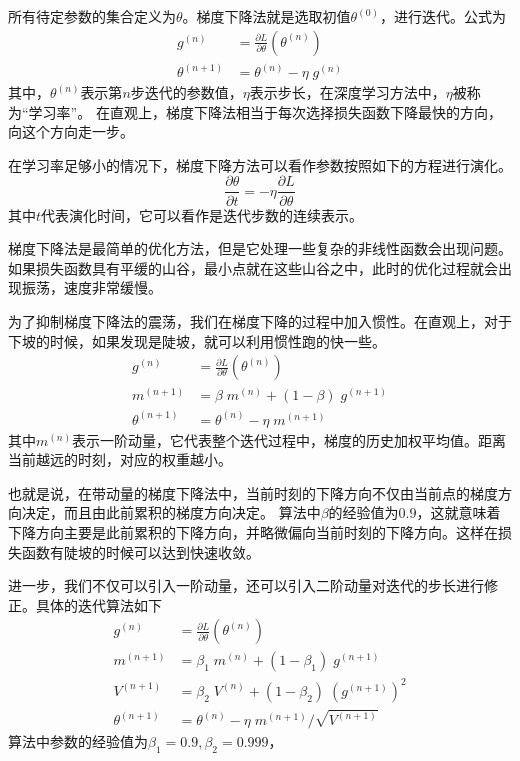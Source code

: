 所有待定参数的集合定义为$\theta$。梯度下降法就是选取初值$\theta^{(0)}$，进行迭代。公式为
\begin{equation}
\begin{split}
g^{(n)} & = \frac{\partial L}{\partial \theta}(\theta^{(n)}) \\
\theta^{(n+1)} & = \theta^{(n)} - \eta \; g^{(n)}
\end{split}
\end{equation}
其中，$\theta^{(n)}$表示第$n$步迭代的参数值，$\eta$表示步长，在深度学习方法中，$\eta$被称为“学习率”。
在直观上，梯度下降法相当于每次选择损失函数下降最快的方向，向这个方向走一步。

在学习率足够小的情况下，梯度下降方法可以看作参数按照如下的方程进行演化。
\begin{equation}
\frac{\partial \theta}{\partial t} = - \eta \frac{\partial L}{\partial \theta}
\end{equation}
其中$t$代表演化时间，它可以看作是迭代步数的连续表示。

梯度下降法是最简单的优化方法，但是它处理一些复杂的非线性函数会出现问题。如果损失函数具有平缓的山谷，最小点就在这些山谷之中，此时的优化过程就会出现振荡，速度非常缓慢。


为了抑制梯度下降法的震荡，我们在梯度下降的过程中加入惯性。在直观上，对于下坡的时候，如果发现是陡坡，就可以利用惯性跑的快一些。
\begin{equation}
\begin{split}
g^{(n)} & = \frac{\partial L}{\partial \theta}(\theta^{(n)}) \\
m^{(n+1)} & = \beta \; m^{(n)} + (1 - \beta) \; g^{(n+1)} \\
\theta^{(n+1)} & = \theta^{(n)} - \eta \; m^{(n+1)}
\end{split}
\end{equation}
其中$m^{(n)}$表示一阶动量，它代表整个迭代过程中，梯度的历史加权平均值。距离当前越远的时刻，对应的权重越小。

也就是说，在带动量的梯度下降法中，当前时刻的下降方向不仅由当前点的梯度方向决定，而且由此前累积的梯度方向决定。 算法中$\beta$的经验值为$0.9$，这就意味着下降方向主要是此前累积的下降方向，并略微偏向当前时刻的下降方向。这样在损失函数有陡坡的时候可以达到快速收敛。


进一步，我们不仅可以引入一阶动量，还可以引入二阶动量对迭代的步长进行修正。具体的迭代算法如下
\begin{equation}
\begin{split}
g^{(n)} & = \frac{\partial L}{\partial \theta}(\theta^{(n)}) \\
m^{(n+1)} & = \beta_1 \; m^{(n)} + (1 - \beta_1) \; g^{(n+1)} \\
V^{(n+1)} & = \beta_2 \; V^{(n)} + (1 - \beta_2) \; (g^{(n+1)})^2 \\
\theta^{(n+1)} & = \theta^{(n)} - \eta \; m^{(n+1)} / \sqrt{V^{(n+1)}}
\end{split}
\end{equation}
算法中参数的经验值为$\beta_1 = 0.9, \beta_2 = 0.999$，

